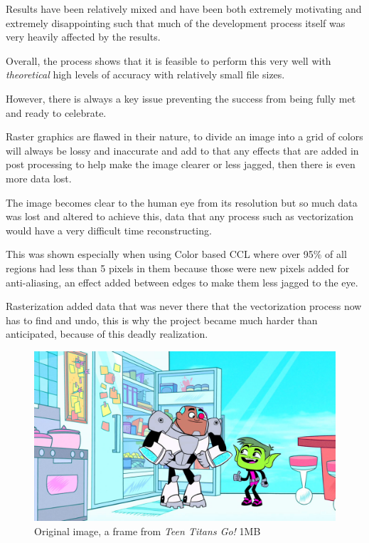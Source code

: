 \documentclass[12pt]{article}
\newcommand{\sentence}{} %
\newcommand{\italic}[1]{\textit{#1}}
\begin{document}
    \tab
    Results have been relatively mixed and have been both extremely motivating and extremely disappointing such that
    much of the development process itself was very heavily affected by the results.
    \sentence
    Overall, the process shows that it is feasible to perform this very well with \italic{theoretical} high levels of
    accuracy with relatively small file sizes.
    \sentence
    However, there is always a key issue preventing the success from being fully met and ready to celebrate.
    \sentence
    Raster graphics are flawed in their nature, to divide an image into a grid of colors will always be lossy and
    inaccurate and add to that any effects that are added in post processing to help make the image clearer or less
    jagged, then there is even more data lost.
    \sentence
    The image becomes clear to the human eye from its resolution but so much data was lost and altered to achieve
    this, data that any process such as vectorization would have a very difficult time reconstructing.
    \sentence
    This was shown especially when using Color based CCL where over 95\% of all regions had less than 5 pixels in
    them because those were new pixels added for anti-aliasing, an effect added between edges to make them less
    jagged to the eye.
    \sentence
    Rasterization added data that was never there that the vectorization process now has to find and undo, this is
    why the project became much harder than anticipated, because of this deadly realization.

    \begin{figure}[h!]
        \centering
        \includegraphics[width=\textwidth]{OriginalFrame.png}
        \caption[OriginalFrame]{Original image, a frame from \italic{Teen Titans Go!} 1MB}
        \label{fig:originalframe}
    \end{figure}
\end{document}
